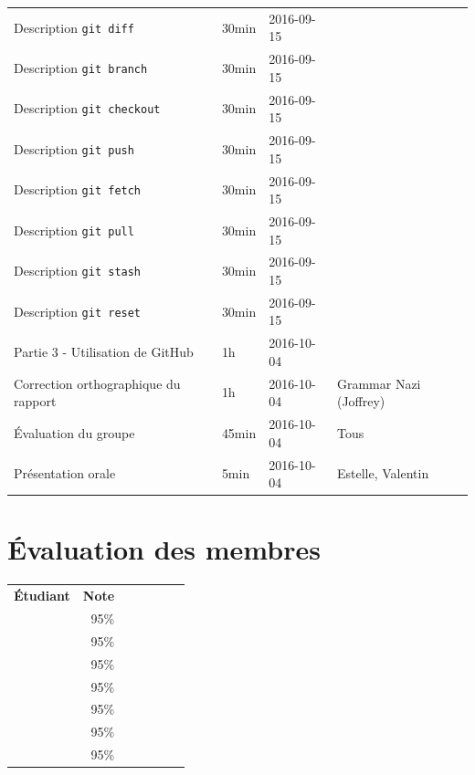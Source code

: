 \documentclass[11pt,canadien]{article}
\begin{document}
\begin{appendices}
\begin{tabular}{l l l l}
	\\ Description \texttt{git diff}        & 30min & 2016-09-15 & \karen
	\\ Description \texttt{git branch}      & 30min & 2016-09-15 & \karen
	\\ Description \texttt{git checkout}    & 30min & 2016-09-15 & \karen
	\\ Description \texttt{git push}        & 30min & 2016-09-15 & \kevin
	\\ Description \texttt{git fetch}       & 30min & 2016-09-15 & \kevin
	\\ Description \texttt{git pull}        & 30min & 2016-09-15 & \kevin
	\\ Description \texttt{git stash}       & 30min & 2016-09-15 & \antoine
	\\ Description \texttt{git reset}       & 30min & 2016-09-15 & \antoine
	\\ Partie 3 - Utilisation de GitHub     & 1h    & 2016-10-04 & \joffrey
	\\ Correction orthographique du rapport & 1h    & 2016-10-04 & Grammar Nazi (Joffrey)
	\\ Évaluation du groupe                 & 45min & 2016-10-04 & Tous
	\\ Présentation orale                   & 5min  & 2016-10-04 & Estelle, Valentin
\end{tabular}

\section{Évaluation des membres}
\begin{tabular}{r r r r r r r}
	\textbf{Étudiant}  & \textbf{Note} \\
	\textbf{\antoine}  & 95\%          \\
	\textbf{\estelle}  & 95\%          \\
	\textbf{\joffrey}  & 95\%          \\
	\textbf{\julien}   & 95\%          \\
	\textbf{\karen}    & 95\%          \\
	\textbf{\kevin}    & 95\%          \\
	\textbf{\valentin} & 95\%
\end{tabular}

\end{appendices}
\end{document}
